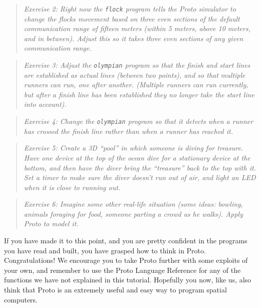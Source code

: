 \documentclass{article}
\newcommand\problem[1]{\begin{quote}{\em #1}\end{quote}}
\newcommand\var[1]{{\tt #1}}
\begin{document}
\problem{Exercise 2: Right now the \var{flock} program tells the Proto
  simulator to change the flocks movement based on three even sections
  of the default communication range of fifteen meters (within 5
  meters, above 10 meters, and in between).  Adjust this so it takes
  three even sections of any given communication range.}

\problem{Exercise 3: Adjust the \var{olympian} program so that the
  finish and start lines are established as actual lines (between two
  points), and so that multiple runners can run, one after another.
  (Multiple runners can run currently, but after a finish line has
  been established they no longer take the start line into account).}

\problem{Exercise 4: Change the \var{olympian} program so that it
  detects when a runner has {\em crossed} the finish line rather than
  when a runner has reached it.}

\problem{Exercise 5: Create a 3D ``pool'' in which someone is diving
  for treasure.  Have one device at the top of the ocean dive for a
  stationary device at the bottom, and then have the diver bring the
  ``treasure'' back to the top with it.  Set a timer to make sure the
  diver doesn't run out of air, and light an LED when it is close to
  running out.}

\problem{Exercise 6: Imagine some other real-life situation (some
  ideas: bowling, animals foraging for food, someone parting a crowd
  as he walks).  Apply Proto to model it.}

If you have made it to this point, and you are pretty confident in the
programs you have read and built, you have grasped how to think in
Proto.  Congratulations!  We encourage you to take Proto further with
some exploits of your own, and remember to use the Proto Language
Reference for any of the functions we have not explained in this
tutorial.  Hopefully you now, like us, also think that Proto is an
extremely useful and easy way to program spatial computers.
\end{document}
